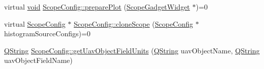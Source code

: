 \begin{DoxyCompactItemize}
\item 
virtual \hyperlink{group___u_a_v_objects_plugin_ga444cf2ff3f0ecbe028adce838d373f5c}{void} \hyperlink{group___scope_plugin_gaacd609b338179da5902c1a644a4d9676}{Scope\-Config\-::prepare\-Plot} (\hyperlink{class_scope_gadget_widget}{Scope\-Gadget\-Widget} $\ast$)=0
\item 
virtual \hyperlink{class_scope_config}{Scope\-Config} $\ast$ \hyperlink{group___scope_plugin_ga550248228c701bfd0a35edf08ec94b1a}{Scope\-Config\-::clone\-Scope} (\hyperlink{class_scope_config}{Scope\-Config} $\ast$histogram\-Source\-Configs)=0
\item 
\hyperlink{group___u_a_v_objects_plugin_gab9d252f49c333c94a72f97ce3105a32d}{Q\-String} \hyperlink{group___scope_plugin_gac9be5bd5f2a8394d4d2de1e8b6e9e382}{Scope\-Config\-::get\-Uav\-Object\-Field\-Units} (\hyperlink{group___u_a_v_objects_plugin_gab9d252f49c333c94a72f97ce3105a32d}{Q\-String} uav\-Object\-Name, \hyperlink{group___u_a_v_objects_plugin_gab9d252f49c333c94a72f97ce3105a32d}{Q\-String} uav\-Object\-Field\-Name)
\end{DoxyCompactItemize}
